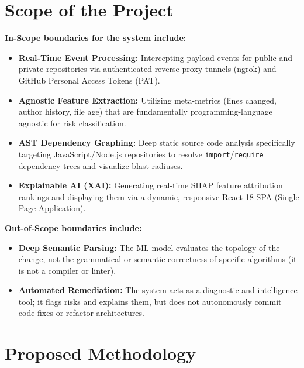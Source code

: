 \documentclass[12pt, a4paper]{article}
\begin{document}
\section{Scope of the Project}

\textbf{In-Scope boundaries for the system include:}
\begin{itemize}
    \item \textbf{Real-Time Event Processing:} Intercepting payload events for public and private repositories via authenticated reverse-proxy tunnels (ngrok) and GitHub Personal Access Tokens (PAT).
    \item \textbf{Agnostic Feature Extraction:} Utilizing meta-metrics (lines changed, author history, file age) that are fundamentally programming-language agnostic for risk classification.
    \item \textbf{AST Dependency Graphing:} Deep static source code analysis specifically targeting JavaScript/Node.js repositories to resolve \texttt{import}/\texttt{require} dependency trees and visualize blast radiuses.
    \item \textbf{Explainable AI (XAI):} Generating real-time SHAP feature attribution rankings and displaying them via a dynamic, responsive React 18 SPA (Single Page Application).
\end{itemize}

\vspace{0.3cm}
\noindent \textbf{Out-of-Scope boundaries include:}
\begin{itemize}
    \item \textbf{Deep Semantic Parsing:} The ML model evaluates the topology of the change, not the grammatical or semantic correctness of specific algorithms (it is not a compiler or linter).
    \item \textbf{Automated Remediation:} The system acts as a diagnostic and intelligence tool; it flags risks and explains them, but does not autonomously commit code fixes or refactor architectures.
\end{itemize}

\clearpage
\section{Proposed Methodology}
\end{document}

